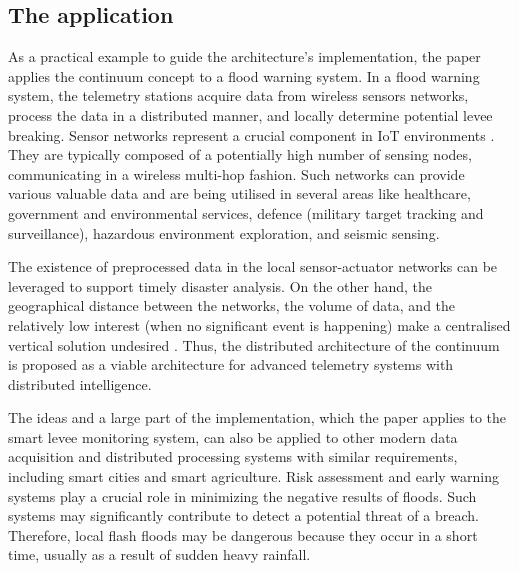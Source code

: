 \subsection{The application}

As a practical example to guide the architecture's implementation, the paper applies the continuum concept to a flood warning system. In a flood warning system, the telemetry stations acquire data from wireless sensors networks, process the data in a distributed manner, and locally determine potential levee breaking. Sensor networks represent a crucial component in IoT environments \cite{yu2017survey}. They are typically composed of a potentially high number of sensing nodes, communicating in a wireless multi-hop fashion. Such networks can provide various valuable data and are being utilised in several areas like healthcare, government and environmental services, defence (military target tracking and surveillance), hazardous environment exploration, and seismic sensing.

The existence of preprocessed data in the local sensor-actuator networks can be leveraged to support timely disaster analysis. On the other hand, the geographical distance between the networks, the volume of data, and the relatively low interest (when no significant event is happening) make a centralised vertical solution undesired \cite{balouek2019towards}. Thus, the distributed architecture of the continuum is proposed as a viable architecture for advanced telemetry systems with distributed intelligence.

The ideas and a large part of the implementation, which the paper applies to the smart levee monitoring system, can also be applied to other modern data acquisition and distributed processing systems with similar requirements, including smart cities and smart agriculture. Risk assessment and early warning systems play a crucial role in minimizing the negative results of floods. Such systems may significantly contribute to detect a potential threat of a breach. Therefore, local flash floods may be dangerous because they occur in a short time, usually as a result of sudden heavy rainfall.


